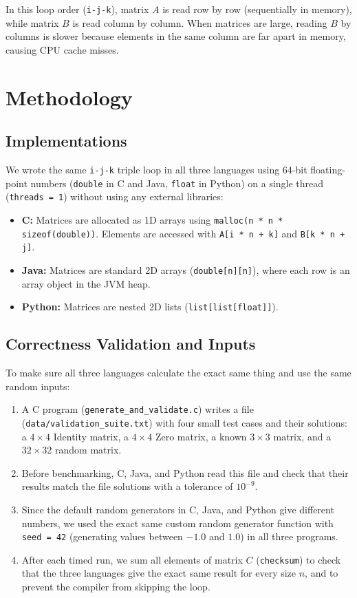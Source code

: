 \documentclass[11pt,a4paper]{article}
\begin{document}
In this loop order (\texttt{i-j-k}), matrix $A$ is read row by row (sequentially in memory), while matrix $B$ is read column by column. When matrices are large, reading $B$ by columns is slower because elements in the same column are far apart in memory, causing CPU cache misses.

\section{Methodology}

\subsection{Implementations}
We wrote the same \texttt{i-j-k} triple loop in all three languages using 64-bit floating-point numbers (\texttt{double} in C and Java, \texttt{float} in Python) on a single thread (\texttt{threads = 1}) without using any external libraries:
\begin{itemize}
    \item \textbf{C:} Matrices are allocated as 1D arrays using \texttt{malloc(n * n * sizeof(double))}. Elements are accessed with \texttt{A[i * n + k]} and \texttt{B[k * n + j]}.
    \item \textbf{Java:} Matrices are standard 2D arrays (\texttt{double[n][n]}), where each row is an array object in the JVM heap.
    \item \textbf{Python:} Matrices are nested 2D lists (\texttt{list[list[float]]}).
\end{itemize}

\subsection{Correctness Validation and Inputs}
To make sure all three languages calculate the exact same thing and use the same random inputs:
\begin{enumerate}
    \item A C program (\texttt{generate\_and\_validate.c}) writes a file (\texttt{data/validation\_suite.txt}) with four small test cases and their solutions: a $4\times 4$ Identity matrix, a $4\times 4$ Zero matrix, a known $3\times 3$ matrix, and a $32\times 32$ random matrix.
    \item Before benchmarking, C, Java, and Python read this file and check that their results match the file solutions with a tolerance of $10^{-9}$.
    \item Since the default random generators in C, Java, and Python give different numbers, we used the exact same custom random generator function with \texttt{seed = 42} (generating values between $-1.0$ and $1.0$) in all three programs.
    \item After each timed run, we sum all elements of matrix $C$ (\texttt{checksum}) to check that the three languages give the exact same result for every size $n$, and to prevent the compiler from skipping the loop.
\end{enumerate}
\end{document}
